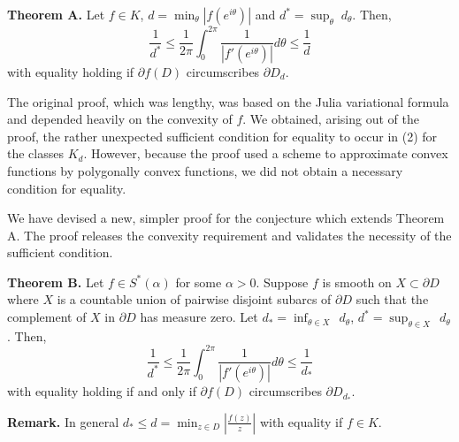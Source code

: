 {\bf Theorem A.} Let $f\in K$, $d=\displaystyle{\min_\theta}
|f(e^{i\theta})|$ and $d^\ast=\displaystyle{\sup_\theta}\; d_\theta$.
Then,
\begin{equation}
\label{eq:2}
\frac{1}{d^\ast}\leq\frac{1}{2\pi}\int^{2\pi}_{0}\frac{1}
{|f'(e^{i\theta})|}d\theta\leq\frac{1}{d}
\end{equation}
with equality holding if $\partial f(D)$ circumscribes $\partial
D_d$.

The original proof, which was lengthy, was based on the Julia
variational formula and depended heavily on the convexity of $f$.  We
obtained, arising out of the proof, the rather unexpected sufficient
condition for equality to occur in (2) for the classes $K_d$.
However, because the proof used a scheme to approximate convex
functions by polygonally convex functions, we did not obtain a
necessary condition for equality.

We have devised a new, simpler proof for the conjecture which extends
Theorem A.  The proof releases the convexity requirement and
validates the necessity of the sufficient condition.

{\bf Theorem B.} Let $f\in S^\ast(\alpha)$ for some $\alpha>0$.
Suppose $f$ is smooth on $X\subset\partial D$ where $X$ is a
countable union of pairwise disjoint subarcs of $\partial D$ such
that the complement of $X$ in $\partial D$ has measure zero.  Let
$d_\ast=\displaystyle{\inf_{\theta\in X}}\:\: d_\theta$,
$d^\ast=\displaystyle{\sup_{\theta\in X}}\:\: d_\theta$.  Then,
\begin{equation}
\label{eq:3}
\frac{1}{d^\ast}\leq\frac{1}{2\pi}\int^{2\pi}_0
\frac{1}{|f'(e^{i\theta})|}d\theta\leq\frac{1}{d_\ast}
\end{equation}
with equality holding if and only if $\partial f(D)$ circumscribes
$\partial D_{d_\ast}$.

{\bf Remark.} In general $d_\ast\leq d=\displaystyle{\min_{z\in
D}|\frac{f(z)}{z}|}$ with equality if $f\in K$.

